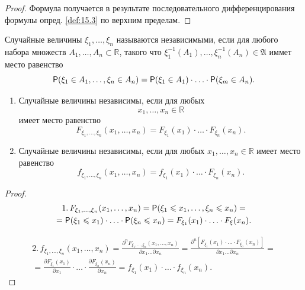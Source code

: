\begin{proof}
	Формула получается в результате последовательного дифференцирования формулы опред. \ref{def:15.3} по верхним пределам.
\end{proof}

\begin{definition}
\label{def:15.5}
	Случайные величины $\xi_1, \dots, \xi_n$ называются независимыми, если для любого набора множеств $A_1,\dots ,A_n \subset \mathbb{R}$, такого что\newline
 	$\xi_1^{-1}(A_1), \dots, \xi_n^{-1}(A_n)\in\mathfrak{A}$ иммет место равенство
 	\begin{equation*}
 		\P(\xi_1\in A_1,\dots,\xi_n\in A_n)=\P(\xi_1 \in A_1)\cdot\ldots\cdot\P(\xi_m\in A_n).
 	\end{equation*}
\end{definition}

 \begin{lemma}
\label{lemma:15.6}

 \begin{enumerate}
 	\item Случайные величины независимы, если для любых $$x_1,\dots, x_n \in \mathbb{R}$$ имеет место равенство
 	\begin{equation*}
 		F_{\xi_1, \dots, \xi_n}(x_1,\dots,x_n)=F_{\xi_1}(x_1)\cdot\ldots\cdot F_{\xi_n}(x_n).
 	\end{equation*}
 	\item Случайные величины независимы, если для любых $x_1,\ldots,x_n\in\mathbb{R}$ имеет место равенство
 	\begin{equation*}
		f_{\xi_1, \dots, \xi_n}(x_1,\dots,x_n)=f_{\xi_1}(x_1)\cdot\ldots\cdot F_{\xi_n}(x_n). 		
 	\end{equation*}
 \end{enumerate}
\end{lemma}

\begin{proof}
	\begin{gather*}
	1. \,F_{\xi_1, \dots, \xi_n}(x_1,\dots,x_n)=\P(\xi_1\leqslant x_1,\ldots,\xi_n
	\leqslant x_n)=\\=
	\P(\xi_1\leqslant x_1)\cdot\ldots\cdot\P(\xi_n\leqslant x_n)=F_{\xi_1}(x_1)\cdot\ldots\cdot F_{\xi}(x_n).
	\end{gather*}	

	
	\begin{gather*}
	2. \,f_{\xi_1,\ldots,\xi_n}(x_1,\ldots,x_n)=
		\frac
		{\partial^nF_{\xi_1, \dots, \xi_n}(x_1,\dots,x_n)}
		{\partial x_1\ldots \partial x_n}=
		\frac
		{\partial^n\left[F_{\xi_1}(x_1)\cdot\ldots\cdot F_{\xi_n}(x_n)\right]}
		{\partial x_1\ldots \partial x_n}=\\=
		\frac{\partial F_{\xi_1}(x_1)}{\partial x_1}\cdot\ldots\cdot
		\frac{\partial F_{\xi_n}(x_n)}{\partial x_n}=f_{\xi_1}(x_1)\cdot\ldots\cdot f_{\xi_n}(x_n).
	\end{gather*}
\end{proof}


